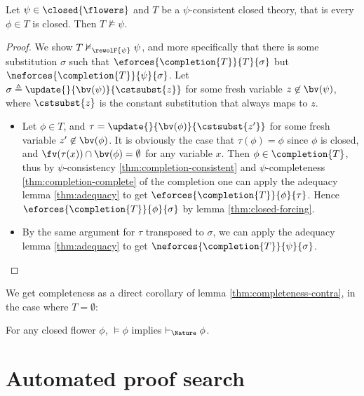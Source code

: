 \begin{lemma}\label{thm:completeness-contra}
  
  Let $\psi \in \closed{\flowers}$ and $T$ be a $\psi$-consistent closed theory,
  that is every $\phi \in T$ is closed. Then $T \nvDash \psi$.
\end{lemma}
\begin{proof}
  We show $T \nvDash_{\rewolF{\psi}} \psi$, and more specifically that there is
  some substitution $\sigma$ such that $\eforces{\completion{T}}{T}{\sigma}$ but
  $\neforces{\completion{T}}{\psi}{\sigma}$. Let $\sigma \triangleq
  \update{}{\bv(\psi)}{\cstsubst{z}}$ for some fresh variable $z \not\in
  \bv(\psi)$, where $\cstsubst{z}$ is the constant substitution that always maps
  to $z$.
  \begin{itemize}
    \item Let $\phi \in T$, and $\tau = \update{}{\bv(\phi)}{\cstsubst{z'}}$ for
    some fresh variable $z' \not\in \bv(\phi)$. It is obviously the case that
    $\tau(\phi) = \phi$ since $\phi$ is closed, and $\fv(\tau(x)) \cap \bv(\phi)
    = \emptyset$ for any variable $x$. Then $\phi \in \completion{T}$, thus by
    $\psi$-consistency \ref{thm:completion-consistent} and $\psi$-completeness
    \ref{thm:completion-complete} of the completion one can apply the adequacy
    lemma \ref{thm:adequacy} to get $\eforces{\completion{T}}{\phi}{\tau}$.
    Hence $\eforces{\completion{T}}{\phi}{\sigma}$ by lemma
    \ref{thm:closed-forcing}.
    \item By the same argument for $\tau$ transposed to $\sigma$, we can apply
    the adequacy lemma \ref{thm:adequacy} to get
    $\neforces{\completion{T}}{\psi}{\sigma}$.
  \end{itemize}
\end{proof}

We get completeness as a direct corollary of lemma
\ref{thm:completeness-contra}, in the case where $T = \emptyset$:

\begin{theorem}[Completeness]
  For any closed flower $\phi$, $\vDash \phi$ implies $\vdash_\Nature \phi$.
\end{theorem}


\section{Automated proof search}



